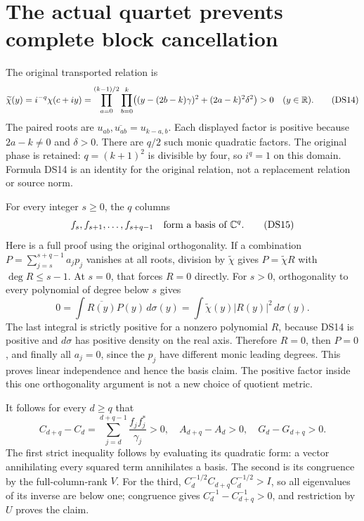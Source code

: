 \section{The actual quartet prevents complete block cancellation}

The original transported relation is
\begin{equation}\label{dsroot:eq:positive-relation}
\widetilde\chi(y)=i^{-q}\chi(c+iy)
=\prod_{a=0}^{(k-1)/2}\prod_{b=0}^{k}
\bigl((y-(2b-k)\gamma)^2+(2a-k)^2\delta^2\bigr)>0
\quad(y\in\mathbb R).
\tag{DS14}
\end{equation}
The paired roots are \(u_{ab},\overline{u_{ab}}=u_{k-a,b}\).
Each displayed factor is positive because \(2a-k\ne0\) and
\(\delta>0\). There are \(q/2\) such monic quadratic factors.
The original phase is retained: \(q=(k+1)^2\) is divisible by four,
so \(i^q=1\) on this domain. Formula DS14 is an identity for the
original relation, not a replacement relation or source norm.

For every integer \(s\geq0\), the \(q\) columns
\begin{equation}\label{dsroot:eq:tailbasis}
f_s,f_{s+1},\ldots,f_{s+q-1}
\quad\text{form a basis of }\mathbb C^q.
\tag{DS15}
\end{equation}
Here is a full proof using the original orthogonality. If a combination
\(P=\sum_{j=s}^{s+q-1}a_jp_j\) vanishes at all roots, division by
\(\widetilde\chi\) gives \(P=\widetilde\chi R\) with
\(\deg R\leq s-1\). At \(s=0\), that forces \(R=0\) directly.
For \(s>0\), orthogonality to every polynomial of degree below \(s\)
gives
\[
0=\int\overline{R(y)}P(y)\,d\sigma(y)
=\int\widetilde\chi(y)|R(y)|^2\,d\sigma(y).
\]
The last integral is strictly positive for a nonzero polynomial
\(R\), because DS14 is positive and \(d\sigma\) has positive density
on the real axis. Therefore \(R=0\), then \(P=0\), and finally all
\(a_j=0\), since the \(p_j\) have different monic leading degrees.
This proves linear independence and hence the basis claim. The
positive factor inside this one orthogonality argument is not a new
choice of quotient metric.

It follows for every \(d\geq q\) that
\begin{equation}\label{dsroot:eq:strictblocks}
C_{d+q}-C_d=\sum_{j=d}^{d+q-1}\frac{f_jf_j^*}{\gamma_j}>0,
\quad A_{d+q}-A_d>0,
\quad G_d-G_{d+q}>0.
\tag{DS16}
\end{equation}
The first strict inequality follows by evaluating its quadratic form:
a vector annihilating every squared term annihilates a basis. The second
is its congruence by the full-column-rank \(V\). For the third,
\(C_d^{-1/2}C_{d+q}C_d^{-1/2}>I\), so all eigenvalues of its inverse
are below one; congruence gives \(C_d^{-1}-C_{d+q}^{-1}>0\), and
restriction by \(U\) proves the claim.

